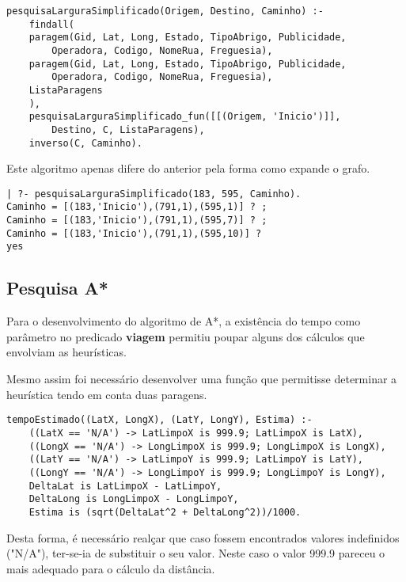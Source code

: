 \documentclass[a4paper,12pt]{report}
\begin{document}
\begin{verbatim}
pesquisaLarguraSimplificado(Origem, Destino, Caminho) :-
    findall(
    paragem(Gid, Lat, Long, Estado, TipoAbrigo, Publicidade,
        Operadora, Codigo, NomeRua, Freguesia),
    paragem(Gid, Lat, Long, Estado, TipoAbrigo, Publicidade,
        Operadora, Codigo, NomeRua, Freguesia),
    ListaParagens
    ),
    pesquisaLarguraSimplificado_fun([[(Origem, 'Inicio')]],
        Destino, C, ListaParagens),
    inverso(C, Caminho).
\end{verbatim}  

\par Este algoritmo apenas difere do anterior pela forma como expande o grafo.

\begin{verbatim}
| ?- pesquisaLarguraSimplificado(183, 595, Caminho).
Caminho = [(183,'Inicio'),(791,1),(595,1)] ? ;
Caminho = [(183,'Inicio'),(791,1),(595,7)] ? ;
Caminho = [(183,'Inicio'),(791,1),(595,10)] ? 
yes
\end{verbatim}

\vspace{1cm}

\subsection{Pesquisa A*}

Para o desenvolvimento do algoritmo de A*, a existência do tempo como parâmetro no predicado \textbf{viagem} permitiu poupar alguns dos cálculos que envolviam as heurísticas.

\par Mesmo assim foi necessário desenvolver uma função que permitisse determinar a heurística tendo em conta duas paragens.

\begin{verbatim}
tempoEstimado((LatX, LongX), (LatY, LongY), Estima) :- 
    ((LatX == 'N/A') -> LatLimpoX is 999.9; LatLimpoX is LatX),
    ((LongX == 'N/A') -> LongLimpoX is 999.9; LongLimpoX is LongX),
    ((LatY == 'N/A') -> LatLimpoY is 999.9; LatLimpoY is LatY),
    ((LongY == 'N/A') -> LongLimpoY is 999.9; LongLimpoY is LongY),
    DeltaLat is LatLimpoX - LatLimpoY,
    DeltaLong is LongLimpoX - LongLimpoY,
    Estima is (sqrt(DeltaLat^2 + DeltaLong^2))/1000.
\end{verbatim}

\par Desta forma, é necessário realçar que caso fossem encontrados valores indefinidos ("N/A"), ter-se-ia de substituir o seu valor. Neste caso o valor 999.9 pareceu o mais adequado para o cálculo da distância.
\end{document}
